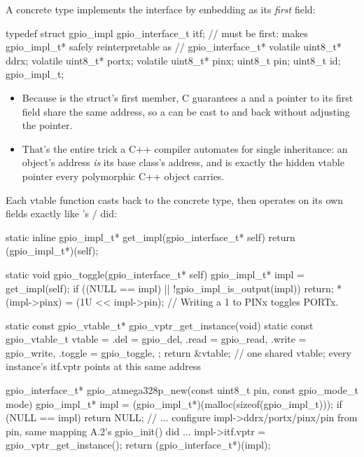 A concrete type implements the interface by embedding  as its \emph{first}
field:

\begin{ccode}
typedef struct gpio_impl
{
    gpio_interface_t itf;   // must be first: makes gpio_impl_t* safely reinterpretable as
                             // gpio_interface_t*
    volatile uint8_t* ddrx;
    volatile uint8_t* portx;
    volatile uint8_t* pinx;
    uint8_t pin;
    uint8_t id;
} gpio_impl_t;
\end{ccode}

\begin{itemize}
  \item Because  is the struct's first member, C guarantees a  and a
    pointer to its first field share the same address, so a  can be cast to
     and back without adjusting the pointer.
  \item That's the entire trick a C++ compiler automates for single inheritance: an object's
    address \emph{is} its base class's address, and  is exactly the hidden vtable
    pointer every polymorphic C++ object carries.
\end{itemize}
Each vtable function casts back to the concrete type, then operates on its own fields exactly like
's / did:

\begin{ccode}
static inline gpio_impl_t* get_impl(gpio_interface_t* self) { return (gpio_impl_t*)(self); }

static void gpio_toggle(gpio_interface_t* self)
{
    gpio_impl_t* impl = get_impl(self);
    if ((NULL == impl) || !gpio_impl_is_output(impl)) { return; }
    *(impl->pinx) = (1U << impl->pin); // Writing a 1 to PINx toggles PORTx.
}

static const gpio_vtable_t* gpio_vptr_get_instance(void)
{
    static const gpio_vtable_t vtable = {
        .del = gpio_del, .read = gpio_read, .write = gpio_write, .toggle = gpio_toggle,
    };
    return &vtable;   // one shared vtable; every instance's itf.vptr points at this same address
}

gpio_interface_t* gpio_atmega328p_new(const uint8_t pin, const gpio_mode_t mode)
{
    gpio_impl_t* impl = (gpio_impl_t*)(malloc(sizeof(gpio_impl_t)));
    if (NULL == impl) { return NULL; }
    // ... configure impl->ddrx/portx/pinx/pin from pin, same mapping A.2's gpio_init() did ...
    impl->itf.vptr = gpio_vptr_get_instance();
    return (gpio_interface_t*)(impl);
}
\end{ccode}

